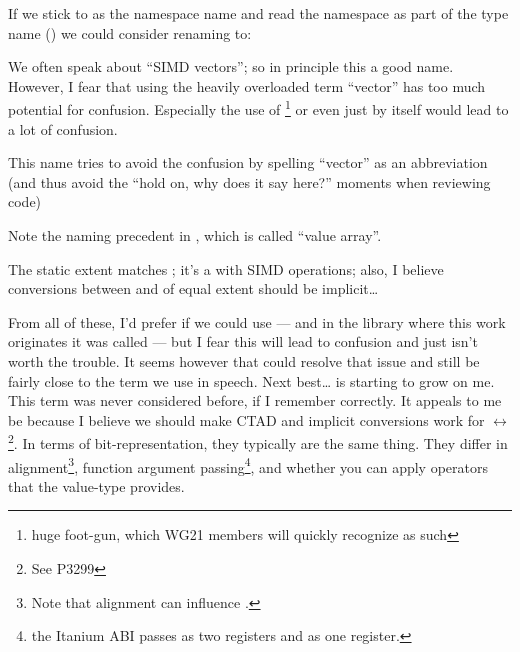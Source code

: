 If we stick to \std{} as the namespace name and read the namespace as
part of the type name () we could consider renaming
 to:
\begin{list}{}{
  \setlength{\topsep}{0pt}%
  \setlength{\leftmargin}{7em}%
  \setlength{\rightmargin}{0pt}%
  \setlength{\labelwidth}{7em}%
}

  \item[\code{simd::vector}]
    We often speak about “SIMD vectors”; so in principle this a good name.
    However, I fear that using the heavily overloaded term “vector” has too
    much potential for confusion.
    Especially the use of \footnote{huge foot-gun, which WG21 members will quickly
    recognize as such} or even just  by
    itself would lead to a lot of confusion.

  \item[\code{simd::vec}]
    This name tries to avoid the confusion by spelling “vector” as an
    abbreviation (and thus avoid the “hold on, why does it say 
    here?” moments when reviewing code)

  \item[\code{simd::value}]
    Note the naming precedent in , which is called “value
    array”.

  \item[\code{simd::values}]

  \item[\code{simd::array}]
    The static extent matches \std{}; it's a \std{} with
    SIMD operations; also, I believe conversions between  and
    \std{} of equal extent should be implicit\ldots
\end{list}

From all of these, I'd prefer if we could use  --- and
in the library where this work originates it was called 
--- but I fear this will lead to confusion and just isn't worth the trouble.
It seems however that  could resolve that issue and still
be fairly close to the term we use in speech.
Next best\ldots{}  is starting to grow on me.
This term was never considered before, if I remember correctly.
It appeals to me be because I believe we should make CTAD and implicit
conversions work for  $\leftrightarrow$ \footnote{See P3299}.
In terms of bit-representation, they typically are the same thing.
They differ in alignment\footnote{Note that alignment can influence
.}, function argument passing\footnote{\Eg the Itanium ABI passes
   as two  registers and 
as one  register.}, and whether you can apply operators that the
value-type provides.

